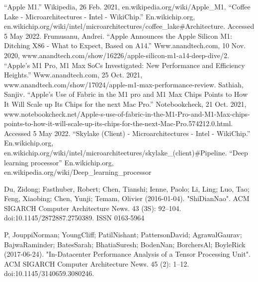 \documentclass[11pt]{article}
\begin{document}
\newpage
\begin{thebibliography}{}
“Apple M1.” Wikipedia, 26 Feb. 2021, en.wikipedia.org/wiki/Apple\_M1.
“Coffee Lake - Microarchitectures - Intel - WikiChip.” En.wikichip.org, en.wikichip.org/wiki/intel/microarchitectures/coffee\_lake\#Architecture. Accessed 5 May 2022.
Frumusanu, Andrei. “Apple Announces the Apple Silicon M1: Ditching X86 - What to Expect, Based on A14.” Www.anandtech.com, 10 Nov. 2020, www.anandtech.com/show/16226/apple-silicon-m1-a14-deep-dive/2.
 “Apple’s M1 Pro, M1 Max SoCs Investigated: New Performance and Efficiency Heights.” Www.anandtech.com, 25 Oct. 2021, www.anandtech.com/show/17024/apple-m1-max-performance-review.
Sathiah, Sanjiv. “Apple’s Use of Fabric in the M1 pro and M1 Max Chips Points to How It Will Scale up Its Chips for the next Mac Pro.” Notebookcheck, 21 Oct. 2021, www.notebookcheck.net/Apple-s-use-of-fabric-in-the-M1-Pro-and-M1-Max-chips-points-to-how-it-will-scale-up-its-chips-for-the-next-Mac-Pro.574212.0.html. Accessed 5 May 2022.
“Skylake (Client) - Microarchitectures - Intel - WikiChip.” En.wikichip.org, en.wikichip.org/wiki/intel/microarchitectures/skylake\_(client)\#Pipeline.
“Deep learning processor” En.wikichip.org, en.wikipedia.org/wiki/Deep\_learning\_processor

Du, Zidong; Fasthuber, Robert; Chen, Tianshi; Ienne, Paolo; Li, Ling; Luo, Tao; Feng, Xiaobing; Chen, Yunji; Temam, Olivier (2016-01-04). "ShiDianNao". ACM SIGARCH Computer Architecture News. 43 (3S): 92–104. doi:10.1145/2872887.2750389. ISSN 0163-5964

 P, JouppiNorman; YoungCliff; PatilNishant; PattersonDavid; AgrawalGaurav; BajwaRaminder; BatesSarah; BhatiaSuresh; BodenNan; BorchersAl; BoyleRick (2017-06-24). "In-Datacenter Performance Analysis of a Tensor Processing Unit". ACM SIGARCH Computer Architecture News. 45 (2): 1–12. doi:10.1145/3140659.3080246.

\end{thebibliography}

\newpage
\end{document}
